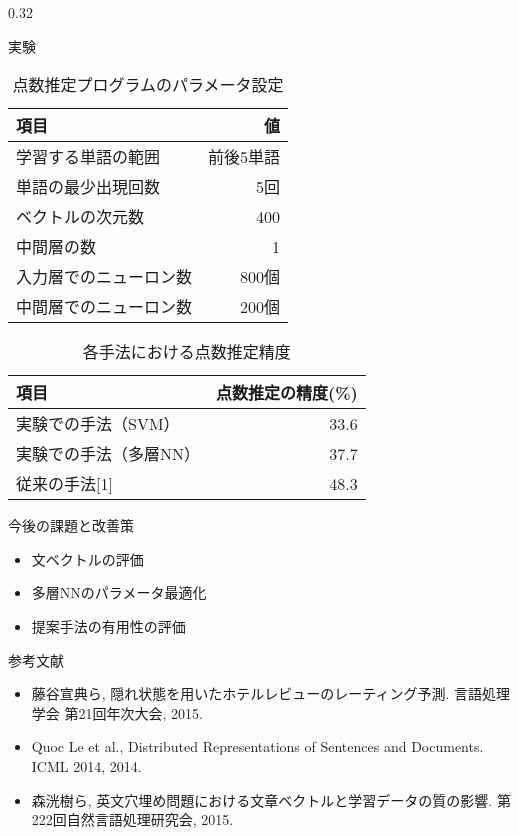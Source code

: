 \documentclass[10pt,unicode]{beamer}
\newcommand{\columnsize}{0.32}
\begin{document}
\begin{frame}{}
\begin{columns}[t]
\begin{column}{\columnsize\textwidth}
\begin{block}{実験}
    \begin{table}
    \caption{点数推定プログラムのパラメータ設定}
    \label{table:parameters}
    \begin{tabular}{l | r}
    項目 & 値 \\
    \hline
    学習する単語の範囲 & 前後5単語 \\
    単語の最少出現回数 & 5回 \\
    ベクトルの次元数 & 400 \\
    中間層の数 & 1 \\
    入力層でのニューロン数 & 800個 \\
    中間層でのニューロン数 & 200個
    \end{tabular}
    \end{table}

    \begin{table}
    \caption{各手法における点数推定精度}
    \label{table:accuracy}
    \begin{tabular}{l | r}
    項目 & 点数推定の精度(\%) \\
    \hline
    実験での手法（SVM）& 33.6 \\
    実験での手法（多層NN）& 37.7 \\
    従来の手法[1] & 48.3
    \end{tabular}
    \end{table}
  \end{block} %

  \begin{block}{今後の課題と改善策}
    \begin{itemize}
    \item 文ベクトルの評価
    \item 多層NNのパラメータ最適化
    \item 提案手法の有用性の評価
    \end{itemize}
  \end{block} %

  参考文献 \\
  \begin{itemize}
  \item 藤谷宣典ら, 隠れ状態を用いたホテルレビューのレーティング予測.
  言語処理学会 第21回年次大会, 2015. \\
  \item Quoc Le et al., Distributed Representations of Sentences and Documents.
  ICML 2014, 2014. \\
  \item 森洸樹ら, 英文穴埋め問題における文章ベクトルと学習データの質の影響.
  第222回自然言語処理研究会, 2015.
  \end{itemize}
\end{column} %

\end{columns}
\end{frame}
\end{document}
